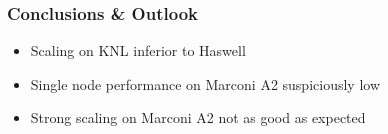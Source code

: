 \documentclass{beamer}
\begin{document}

  \begin{frame}
    \frametitle{Conclusions \& Outlook}

    \begin{itemize}
      \item Scaling on KNL inferior to Haswell
      \item Single node performance on Marconi A2 suspiciously low
      \item Strong scaling on Marconi A2 not as good as expected
    \end{itemize}
  \end{frame}


  \begin{frame}
    \titlepage
  \end{frame}

  
\end{document}
